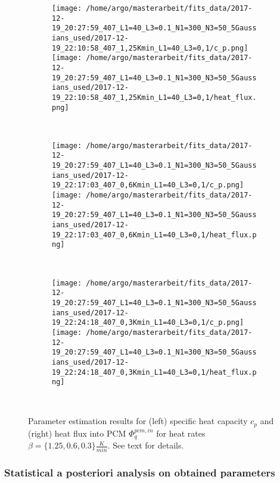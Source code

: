\documentclass{scrartcl}[12pt, halfparskip]
\numberwithin{equation}{section}
\numberwithin{figure}{section}
\numberwithin{table}{section}
\begin{document}
\begin{figure}[H]
	\begin{subfigure}{1.\textwidth}
		\texttt{[image: /home/argo/masterarbeit/fits\_data/2017-12-19\_20:27:59\_407\_L1=40\_L3=0.1\_N1=300\_N3=50\_5Gaussians\_used/2017-12-19\_22:10:58\_407\_1,25Kmin\_L1=40\_L3=0,1/c\_p.png]}
		\texttt{[image: /home/argo/masterarbeit/fits\_data/2017-12-19\_20:27:59\_407\_L1=40\_L3=0.1\_N1=300\_N3=50\_5Gaussians\_used/2017-12-19\_22:10:58\_407\_1,25Kmin\_L1=40\_L3=0,1/heat\_flux.png]}
	\end{subfigure} \\[1ex]
	
	
	\begin{subfigure}{1.\textwidth}
		\texttt{[image: /home/argo/masterarbeit/fits\_data/2017-12-19\_20:27:59\_407\_L1=40\_L3=0.1\_N1=300\_N3=50\_5Gaussians\_used/2017-12-19\_22:17:03\_407\_0,6Kmin\_L1=40\_L3=0,1/c\_p.png]}
		\texttt{[image: /home/argo/masterarbeit/fits\_data/2017-12-19\_20:27:59\_407\_L1=40\_L3=0.1\_N1=300\_N3=50\_5Gaussians\_used/2017-12-19\_22:17:03\_407\_0,6Kmin\_L1=40\_L3=0,1/heat\_flux.png]}
	\end{subfigure} \\[1ex]
	
	
	\begin{subfigure}{1.\textwidth}
		\texttt{[image: /home/argo/masterarbeit/fits\_data/2017-12-19\_20:27:59\_407\_L1=40\_L3=0.1\_N1=300\_N3=50\_5Gaussians\_used/2017-12-19\_22:24:18\_407\_0,3Kmin\_L1=40\_L3=0,1/c\_p.png]}
		\texttt{[image: /home/argo/masterarbeit/fits\_data/2017-12-19\_20:27:59\_407\_L1=40\_L3=0.1\_N1=300\_N3=50\_5Gaussians\_used/2017-12-19\_22:24:18\_407\_0,3Kmin\_L1=40\_L3=0,1/heat\_flux.png]}
	\end{subfigure} \\[1ex]
	
	

	\caption{Parameter estimation results for (left) specific heat capacity $c_p$ and (right) heat flux into PCM $\varPhi_q^{pcm,in}$ for heat rates $\beta=\{ 1.25, 0.6, 0.3 \} \frac{K}{min}$. See text for details.}
	\label{fig:optim_c_p_heat_flux_5Gaussians_2}
\end{figure}

\subsubsection{Statistical a posteriori analysis on obtained parameters}
\end{document}

